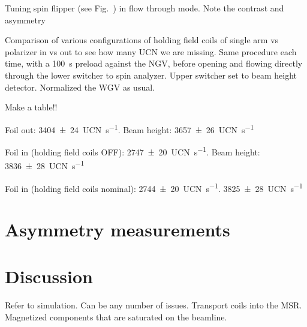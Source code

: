 Tuning spin flipper (see Fig.~) in flow through mode. Note the contrast and asymmetry

Comparison of various configurations of holding field coils of single arm vs polarizer in vs out to see how many UCN we are missing. Same procedure each time, with a \qty{100}{s} preload against the NGV, before opening and flowing directly through the lower switcher to spin analyzer. Upper switcher set to beam height detector. Normalized the WGV as usual.

Make a table!!

Foil out: \qty{3404(24)}{UCN\per s}. Beam height: \qty{3657(26)}{UCN\per s}

Foil in (holding field coils OFF): \qty{2747(20)}{UCN\per s}. Beam height: \qty{3836(28)}{UCN\per s}

Foil in (holding field coils nominal): \qty{2744(20)}{UCN\per s}. \qty{3825(28)}{UCN\per s}


\section{Asymmetry measurements}



\section{Discussion}


Refer to simulation. Can be any number of issues. Transport coils into the MSR. Magnetized components that are saturated on the beamline.